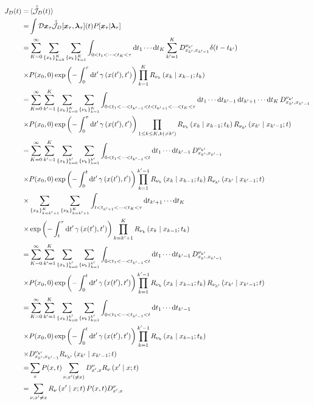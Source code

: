 \documentclass{ltjsarticle}
\begin{document}
\begin{align}
  J_D(t)=&\ev*{\hat{\dot{\mathcal{J}}}_D(t)}\\
  =&\int \mathcal{D}\bm{x}_\tau \hat{\dot{\mathcal{J}}}_D[\bm{x}_\tau,\bm{\lambda}_\tau](t)P[\bm{x}_\tau|\bm{\lambda}_\tau]\\
  =&\sum_{K=0}^{\infty}\sum_{\lbrace x_k\rbrace_{k=0}^K}\sum_{\lbrace\nu_k\rbrace_{k=1}^K}\int_{0<t_1<\cdots<t_K<\tau}\dd{t_1}\cdots \dd{t_K}\sum_{k'=1}^K D^{\nu_{k'}}_{x_{k'},x_{k'-1}}\delta(t-t_{k'})\\
  \times&P(x_0,0)\exp\left(-\int_0^\tau \dd{t'}\gamma\left(x(t'),t'\right)\right)\prod_{k=1}^K R_{\nu_k}\left(x_k\mid x_{k-1};t_k\right)\\
  =&\sum_{K=0}^{\infty}\sum_{k'=1}^K\sum_{\lbrace x_k\rbrace_{k=0}^K}\sum_{\lbrace\nu_k\rbrace_{k=1}^K}\int_{0<t_1<\cdots<t_{k'-1}<t<t_{k'+1}<\cdots<t_K<\tau}\dd{t_1}\cdots\dd{t_{k'-1}}\dd{t_{k'+1}}\cdots \dd{t_K} D^{\nu_{k'}}_{x_{k'},x_{k'-1}}\\
  \times&P(x_0,0)\exp\left(-\int_0^\tau \dd{t'}\gamma\left(x(t'),t'\right)\right)\prod_{1\le k\le K,k(\neq k')} R_{\nu_{k}}\left(x_{k}\mid x_{k-1};t_k\right)R_{\nu_{k'}}\left(x_{k'}\mid x_{k'-1};t\right)\\
  =&\sum_{K=0}^{\infty}\sum_{k'=1}^K\sum_{\lbrace x_k\rbrace_{k=0}^{k'}}\sum_{\lbrace\nu_k\rbrace_{k=1}^{k'}}\int_{0<t_1<\cdots<t_{k'-1}<t}\dd{t_1}\cdots\dd{t_{k'-1}}D^{\nu_{k'}}_{x_{k'},x_{k'-1}} \\
  \times&P(x_0,0)\exp\left(-\int_0^t \dd{t'}\gamma\left(x(t'),t'\right)\right)\prod_{k=1}^{k'-1} R_{\nu_k}\left(x_k\mid x_{k-1};t_k\right)R_{\nu_{k'}}\left(x_{k'}\mid x_{k'-1};t\right)\\
  \times&\sum_{\lbrace x_k\rbrace_{k=k'+1}^{K}}\sum_{\lbrace\nu_k\rbrace_{k=k'+1}^{K}}\int_{t<t_{k'+1}<\cdots<t_K<\tau}\dd{t_{k'+1}}\cdots \dd{t_K}\\
  \times&\exp\left(-\int_t^\tau \dd{t'}\gamma\left(x(t'),t'\right)\right)\prod_{k=k'+1}^K R_{\nu_k}\left(x_k\mid x_{k-1};t_k\right)\\
  =&\sum_{K=0}^{\infty}\sum_{k'=1}^K\sum_{\lbrace x_k\rbrace_{k=0}^{k'}}\sum_{\lbrace\nu_k\rbrace_{k=1}^{k'}}\int_{0<t_1<\cdots<t_{k'-1}<t}\dd{t_1}\cdots\dd{t_{k'-1}}D^{\nu_{k'}}_{x_{k'},x_{k'-1}} \\
  \times&P(x_0,0)\exp\left(-\int_0^t \dd{t'}\gamma\left(x(t'),t'\right)\right)\prod_{k=1}^{k'-1} R_{\nu_k}\left(x_k\mid x_{k-1};t_k\right)R_{\nu_{k'}}\left(x_{k'}\mid x_{k'-1};t\right)\\
  =&\sum_{K=0}^{\infty}\sum_{k'=1}^K\sum_{\lbrace x_k\rbrace_{k=0}^{k'}}\sum_{\lbrace\nu_k\rbrace_{k=1}^{k'}}\int_{0<t_1<\cdots<t_{k'-1}<t}\dd{t_1}\cdots\dd{t_{k'-1}} \\
  \times&P(x_0,0)\exp\left(-\int_0^t \dd{t'}\gamma\left(x(t'),t'\right)\right)\prod_{k=1}^{k'-1} R_{\nu_k}\left(x_k\mid x_{k-1};t_k\right)\\
  \times&D^{\nu_{k'}}_{x_{k'},x_{k'-1}}R_{\nu_{k'}}\left(x_{k'}\mid x_{k'-1};t\right)\\
  =&\sum_{x}P(x,t)\sum_{\nu,x'(\neq x)}D^{\nu}_{x',x}R_{\nu}\left(x'\mid x;t\right)\\
  =&\sum_{\nu,x'\neq x}R_{\nu}\left(x'\mid x;t\right)P(x,t)D^{\nu}_{x',x}
  \label{eq:path_integral_JD}
\end{align}
\end{document}
